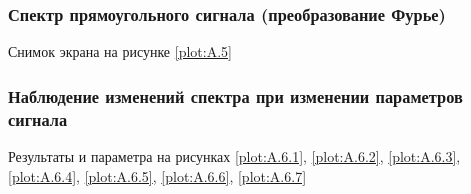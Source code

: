 \documentclass[a4paper, 12pt]{article}
\begin{document}
            \subsubsection{Спектр прямоугольного сигнала (преобразование Фурье)}

                Снимок экрана на рисунке \ref{plot:A.5}

            \subsubsection{Наблюдение изменений спектра при изменении параметров сигнала}

                Результаты и параметра на рисунках \ref{plot:A.6.1}, \ref{plot:A.6.2}, \ref{plot:A.6.3}, \ref{plot:A.6.4}, \ref{plot:A.6.5}, \ref{plot:A.6.6}, \ref{plot:A.6.7}
\end{document}
